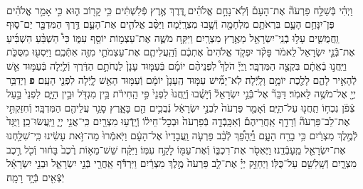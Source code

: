\documentclass[twoside, openany, parskip=half, 11pt]{book}
\begin{document}
\begin{sometimes}
\begin{footnotesize}
\begin{multicols}{2}
\\
וַיְהִ֗י בְּֿשַׁלַּ֣ח פַּרְעֹה֘ אֶת־הָעָם֒ וְֿלֹֽא־נָחָ֣ם אֱלֹהִ֗ים דֶּ֚רֶךְ אֶ֣רֶץ פְּֿלִשְׁתִּ֔ים כִּ֥י קָר֖וֹב ה֑וּא כִּ֣י אָמַ֣ר אֱלֹהִ֗ים פֶּן־יִנָּחֵ֥ם הָעָ֛ם בִּרְאֹתָ֥ם מִלְחָמָ֖ה וְֿשָׁ֥בוּ מִצְרָֽיְֿמָה׃ וַיַּסֵּ֨ב אֱלֹהִ֧ים אֶת־הָעָ֛ם דֶּ֥רֶךְ הַמִּדְבָּ֖ר יַם־ס֑וּף וַֽחֲמֻשִׁ֛ים עָל֥וּ בְֿנֵֽי־יִשְׂרָאֵ֖ל מֵאֶ֥רֶץ מִצְרָֽיִם׃ וַיִּקַּ֥ח מֹשֶׁ֛ה אֶת־עַצְמ֥וֹת יוֹסֵ֖ף עִמּ֑וֹ כִּי֩ הַשְׁבֵּ֨עַ הִשְׁבִּ֜יעַ אֶת־בְּֿֿנֵ֤י יִשְׂרָאֵל֙ לֵאמֹ֔ר פָּקֹ֨ד יִפְקֹ֤ד אֱלֹהִים֙ אֶתְכֶ֔ם וְֿהַֽעֲלִיתֶ֧ם אֶת־עַצְמֹתַ֛י מִזֶּ֖ה אִתְּֿכֶֽם׃
וַיִּסְע֖וּ מִסֻּכֹּ֑ת וַיַּֽחֲנ֣וּ בְֿאֵתָ֔ם בִּקְצֵ֖ה הַמִּדְבָּֽר׃ וַֽיְיָ֡ הֹלֵךְ֩ לִפְנֵיהֶ֨ם יוֹמָ֜ם בְּֿעַמּ֤וּד עָנָן֙ לַנְחֹתָ֣ם הַדֶּ֔רֶךְ וְֿלַ֛יְלָה בְּֿעַמּ֥וּד אֵ֖שׁ לְֿהָאִ֣יר לָהֶ֑ם לָלֶ֖כֶת יוֹמָ֥ם וָלָֽיְֿלָה׃ לֹֽא־יָמִ֞ישׁ עַמּ֤וּד הֶֽעָנָן֙ יוֹמָ֔ם וְֿעַמּ֥וּד הָאֵ֖שׁ לָ֑יְֿלָה לִפְנֵ֖י הָעָֽם׃ \textbf{פ}
וַיְדַבֵּ֥ר יְיָ֖ אֶל־מֹשֶׁ֥ה לֵּאמֹֽר׃ דַּבֵּר֘ אֶל־בְּֿֿנֵ֣י יִשְׂרָאֵל֒ וְֿיָשֻׁ֗בוּ וְֿיַֽחֲנוּ֙ לִפְנֵי֙ פִּ֣י הַֽחִירֹ֔ת בֵּ֥ין מִגְדֹּ֖ל וּבֵ֣ין הַיָּ֑ם לִפְנֵי֙ בַּ֣עַל צְֿפֹ֔ן נִכְח֥וֹ תַֽחֲנ֖וּ עַל־הַיָּֽם׃ וְֿאָמַ֤ר פַּרְעֹה֙ לִבְנֵ֣י יִשְׂרָאֵ֔ל נְֿבֻכִ֥ים הֵ֖ם בָּאָ֑רֶץ סָגַ֥ר עֲלֵיהֶ֖ם הַמִּדְבָּֽר׃ וְֿחִזַּקְתִּ֣י אֶת־לֵב־פַּרְעֹה֘ וְֿרָדַ֣ף אַֽחֲרֵיהֶם֒ וְֿאִכָּֽבְֿדָ֤ה בְּֿפַרְעֹה֙ וּבְכׇל־חֵיל֔וֹ וְֿיָֽדְֿע֥וּ מִצְרַ֖יִם כִּֽי־אֲנִ֣י יְיָ֑ וַיַּֽעֲשׂוּ־כֵֽן׃
וַיֻּגַּד֙ לְֿמֶ֣לֶךְ מִצְרַ֔יִם כִּ֥י בָרַ֖ח הָעָ֑ם וַיֵּֽ֠הָפֵ֠ךְ לְֿבַ֨ב פַּרְעֹ֤ה וַֽעֲבָדָיו֙ אֶל־הָעָ֔ם וַיֹּֽאמְֿרוּ֙ מַה־זֹּ֣את עָשִׂ֔ינוּ כִּֽי־שִׁלַּ֥חְנוּ אֶת־יִשְׂרָאֵ֖ל מֵֽעָבְֿדֵֽנוּ׃ וַיֶּאְסֹ֖ר אֶת־רִכְבּ֑וֹ וְֿאֶת־עַמּ֖וֹ לָקַ֥ח עִמּֽוֹ׃ וַיִּקַּ֗ח שֵׁשׁ־מֵא֥וֹת רֶ֨כֶב֙ בָּח֔וּר וְֿכֹ֖ל רֶ֣כֶב מִצְרָ֑יִם וְֿשָֽׁלִשִׁ֖ם עַל־כֻּלּֽוֹ׃ וַיְחַזֵּ֣ק יְיָ֗ אֶת־לֵ֤ב פַּרְעֹה֙ מֶ֣לֶךְ מִצְרַ֔יִם וַיִּרְדֹּ֕ף אַֽחֲרֵ֖י בְּֿנֵ֣י יִשְׂרָאֵ֑ל וּבְנֵ֣י יִשְׂרָאֵ֔ל יֹֽצְֿאִ֖ים בְּֿיָ֥ד רָמָֽה׃


\end{multicols}
\end{footnotesize}
\end{sometimes}
\end{document}
